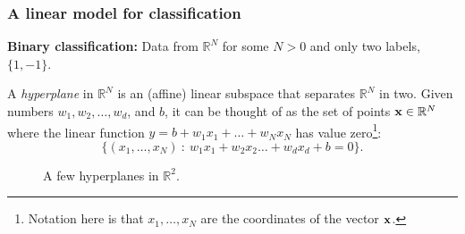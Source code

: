 \documentclass{beamer}
\theoremstyle{example}
\begin{document}
\begin{frame}
\frametitle{A linear model for classification}
    \textbf{Binary classification:} Data from $\mathbb R^N$ for some $N>0$ and only two labels, $\{1, -1\}$. %
    \pause

    A \emph{hyperplane} in $\mathbb R^N$ is an (affine) linear subspace that separates $\mathbb R^N$ in two. %
        Given numbers $w_1,w_2,\ldots,w_d$, and $b$, it can be thought of as the set of points ${\bf x}\in\mathbb R^N$ where the linear function $y=b+w_1x_1+\ldots + w_Nx_N$ has value zero\footnote{Notation here is that $x_1,\ldots,x_N$ are the coordinates of the vector ${\bf x}$.}: 
            \[\{(x_1,\ldots,x_N)\ :\ w_1x_1 + w_2x_2\ldots + w_dx_d + b = 0\}.\]

    \pause
    \begin{figure}[h!]
        \centering
        \caption{A few hyperplanes in $\mathbb R^2$.}
        \label{figure:hyperplanes}
    \end{figure}

\end{frame}
\end{document}
